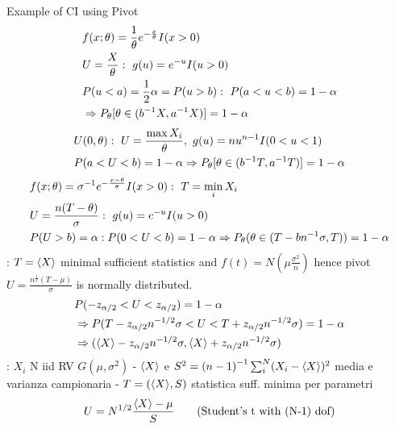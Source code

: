 \documentclass[asd-beamer.tex]{subfiles}
\begin{document}
\begin{frame}[allowframebreaks]{Example of CI using Pivot}
	\begin{align*}
	&f(x;\theta)=\frac{1}{\theta}\exp{-\frac{x}{\theta}}I(x>0)\\
	&U=\frac{X}{\theta}:\ g(u)=\exp{-u}I(u>0)\\
	&P(u<a)=\frac{1}{2}\alpha=P(u>b):\ P(a<u<b)=1-\alpha\\
	&\Rightarrow P_{\theta}[\theta\in(\invers{b}X,\invers{a}X)]=1-\alpha
	\end{align*}
	\begin{align*}
	&U(0,\theta):\ U=\frac{\max X_i}{\theta},\ g(u)=nu^{n-1}I(0<u<1)\\
	&P(a<U<b)=1-\alpha\Rightarrow P_{\theta}[\theta\in(\invers{b}T,\invers{a}T)]=1-\alpha
	\end{align*}
	\begin{align*}
	&f(x;\theta)=\invers{\sigma}\exp{-\frac{x-\theta}{\sigma}}I(x>0):\ T=\min_iX_i\\
	&U=\frac{n(T-\theta)}{\sigma}:\ g(u)=\exp{-u}I(u>0)\\
	&P(U>b)=\alpha: P(0<U<b)=1-\alpha\Rightarrow P_{\theta}(\theta\in(T-b\invers{n}\sigma,T))=1-\alpha
	\end{align*}
	: $T=\langle X \rangle$ minimal sufficient statistics and $f(t)=N(\mu\frac{\sigma^2}{n})$ hence pivot $U=\frac{n^{\frac{1}{2}}(T-\mu)}{\sigma}$ is normally distributed.
	\begin{align*}
	&P(-z_{\alpha/2}<U<z_{\alpha/2})=1-\alpha\\
	&\Rightarrow P(T-z_{\alpha/2}n^{-1/2}\sigma<U<T+z_{\alpha/2}n^{-1/2}\sigma)=1-\alpha\\
	&\Rightarrow(\langle X \rangle-z_{\alpha/2}n^{-1/2}\sigma,\langle X \rangle+z_{\alpha/2}n^{-1/2}\sigma)
	\end{align*}
	: $X_i$ N iid RV $G(\mu,\sigma^2)$ - $\langle X \rangle$ e $S^2={(n-1)}^{-1}\sum_i^N(X_i-\langle X \rangle)^2$ media e varianza campionaria - $T=(\langle X \rangle,S)$ statistica suff. minima per parametri
	\begin{align*}
	&U=N^{1/2}\frac{\exv{X}-\mu}{S}\tag{Student's t with (N-1) dof}\\

\end{align*}
\end{frame}
\end{document}
